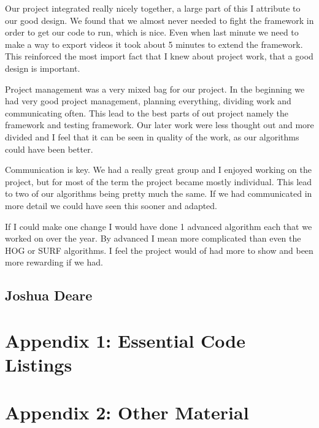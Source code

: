 \documentclass[letterpaper,10pt,titlepage]{article}
\begin{document}
Our project integrated really nicely together, a large part of this I 
attribute to our good design. We found that we almost never needed to
fight the framework in order to get our code to run, which is nice. 
Even when last minute we need to make a way to export videos it took 
about 5 minutes to extend the framework. This reinforced the most 
import fact that I knew about project work, that a good design is 
important.

Project management was a very mixed bag for our project. In the 
beginning we had very good project management, planning everything,
dividing work and communicating often. This lead to the best parts
of out project namely the framework and testing framework. Our later work
were less thought out and more divided and I feel that it can be seen in
quality of the work, as our algorithms could have been better.

Communication is key. We had a really great group and I enjoyed working on the
project, but for most of the term the project became mostly individual. This lead
to two of our algorithms being pretty much the same. If we had communicated in 
more detail we could have seen this sooner and adapted.


If I could make one change I would have done 1 advanced algorithm each that we worked on over the year.
By advanced I mean more complicated than even the HOG or SURF algorithms. I feel
the project would of had more to show and been more rewarding if we had.

\subsection*{Joshua Deare}

\section*{Appendix 1: Essential Code Listings}

\section*{Appendix 2: Other Material}
\end{document}
